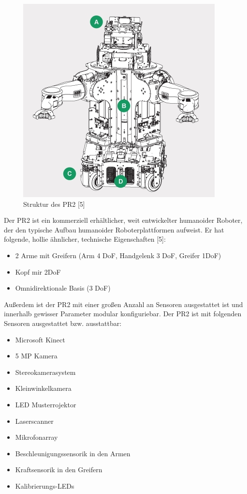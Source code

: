 \begin{figure}[h]
\center
\includegraphics[scale=0.5]{graphics/PR2Struktur.jpg}
\caption{\label{fig:PR2Struktur} Struktur des PR2 [5]}
\end{figure}

Der PR2 ist ein kommerziell erhältlicher, weit entwickelter humanoider Roboter, der den typische Aufbau humanoider Roboterplattformen aufweist.
 Er hat folgende, \gls{hollie} ähnlicher, technische Eigenschaften [5]:

\begin{itemize}
  \item 2 Arme mit Greifern (Arm 4 DoF, Handgelenk 3 DoF, Greifer 1DoF)
  \item Kopf mir 2DoF
  \item Omnidirektionale Basis (3 DoF)
\end{itemize}

Außerdem ist der PR2 mit einer großen Anzahl an Sensoren ausgestattet
 ist und innerhalb gewisser Parameter modular konfiguriebar.
 Der PR2 ist mit folgenden Sensoren ausgestattet bzw. ausstattbar:

\begin{itemize}
  \item Microsoft Kinect
  \item 5 MP Kamera
  \item Stereokamerasystem
  \item Kleinwinkelkamera
  \item LED Musterrojektor
  \item Laserscanner
  \item Mikrofonarray
  \item Beschleunigungssensorik in den Armen
  \item Kraftsensorik in den Greifern
  \item Kalibrierungs-LEDs
\end{itemize}

